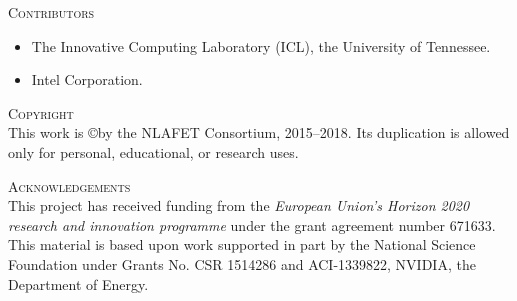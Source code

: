 \documentclass[a4paper,12pt]{article}
\begin{document}
\noindent
\textsc{Contributors}\\[1em]

\begin{itemize}
\item The Innovative Computing Laboratory (ICL), the University of Tennessee.
\item Intel Corporation.
\end{itemize}

\vspace{2em}

\noindent
\textsc{Copyright}\\[1em]
This work is \copyright by the NLAFET Consortium, 2015--2018.
Its duplication is allowed only for personal, educational, or research uses.

\vspace{2em}


\noindent
\textsc{Acknowledgements}\\[1em] This project has received funding
from the \emph{European Union's Horizon 2020 research and innovation
  programme} under the grant agreement number 671633.  This material
is based upon work supported in part by the National Science
Foundation under Grants No. CSR 1514286 and ACI-1339822, NVIDIA, the
Department of Energy.

%

\newpage

\renewcommand{\contentsname}{Table of Contents}
\tableofcontents

\listoffigures



\newpage

%











\end{document}
